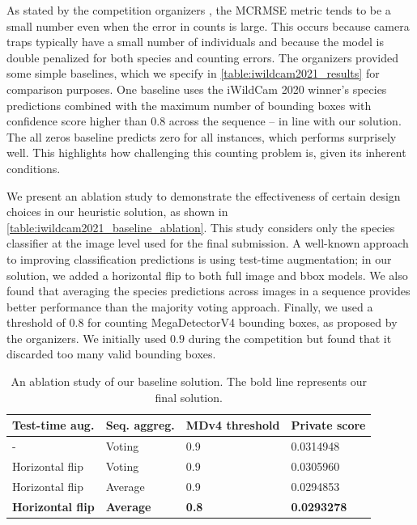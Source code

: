 As stated by the competition organizers \citep{beery2021iwildcam}, the MCRMSE
metric tends to be a small number even when the error in counts is large. This
occurs because camera traps typically have a small number of individuals and
because the model is double penalized for both species and counting errors. The
organizers provided some simple baselines, which we specify in
\autoref{table:iwildcam2021_results} for comparison purposes. One baseline
uses the iWildCam 2020 winner's species predictions combined with the maximum
number of bounding boxes with confidence score higher than 0.8 across the
sequence -- in line with our solution. The all zeros baseline predicts zero for
all instances, which performs surprisely well. This highlights how challenging
this counting problem is, given its inherent conditions.

We present an ablation study to demonstrate the effectiveness of certain design
choices in our heuristic solution, as shown in
\autoref{table:iwildcam2021_baseline_ablation}. This study considers only the
species classifier at the image level used for the final submission. A
well-known approach to improving classification predictions is using test-time
augmentation; in our solution, we added a horizontal flip to both full image and
bbox models. We also found that averaging the species predictions across images
in a sequence provides better performance than the majority voting approach.
Finally, we used a threshold of $0.8$ for counting MegaDetectorV4 bounding
boxes, as proposed by the organizers. We initially used $0.9$ during the
competition but found that it discarded too many valid bounding boxes.

\begin{table}[htb]
\caption{An ablation study of our baseline solution. The bold line represents
our final solution.}
\label{table:iwildcam2021_baseline_ablation}
\begin{center}
\begin{tabular}{llll}
\hline
\textbf{Test-time aug.} & \textbf{Seq. aggreg.} &
\textbf{MDv4 threshold} & \textbf{Private score} \\ \hline
-               & Voting  & 0.9 & 0.0314948 \\
Horizontal flip & Voting  & 0.9 & 0.0305960 \\
Horizontal flip & Average & 0.9 & 0.0294853 \\
\textbf{Horizontal flip} & \textbf{Average}  & \textbf{0.8} & \textbf{0.0293278}
 \\
\hline
\end{tabular}
\end{center}
\end{table}

